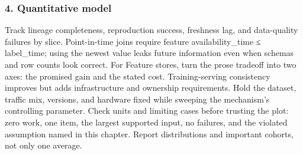 \subsubsection*{4. Quantitative model}
Track lineage completeness, reproduction success, freshness lag, and data-quality failures by slice. Point-in-time joins require feature availability\_time ≤ label\_time; using the newest value leaks future information even when schemas and row counts look correct.
For Feature stores, turn the prose tradeoff into two axes: the promised gain and the stated cost. Training-serving consistency improves but adds infrastructure and ownership requirements. Hold the dataset, traffic mix, versions, and hardware fixed while sweeping the mechanism's controlling parameter.
Check units and limiting cases before trusting the plot: zero work, one item, the largest supported input, no failures, and the violated assumption named in this chapter. Report distributions and important cohorts, not only one average.
